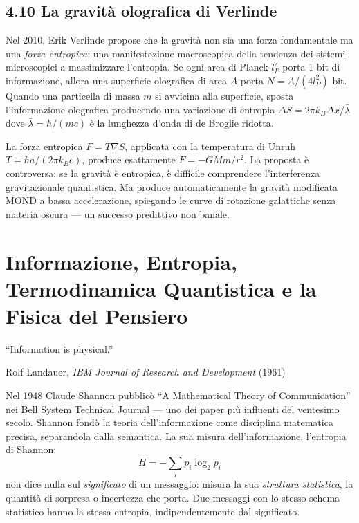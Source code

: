 \documentclass[11.5pt,a4paper,openany]{book}
\theoremstyle{remark}
\begin{document}
\section{4.10 La gravità olografica di Verlinde}

Nel 2010, Erik Verlinde propose che la gravità non sia una forza fondamentale ma una \textit{forza entropica}: una manifestazione macroscopica della tendenza dei sistemi microscopici a massimizzare l'entropia. Se ogni area di Planck $l_P^2$ porta 1 bit di informazione, allora una superficie olografica di area $A$ porta $N = A/(4l_P^2)$ bit. Quando una particella di massa $m$ si avvicina alla superficie, sposta l'informazione olografica producendo una variazione di entropia $\Delta S = 2\pi k_B \Delta x/\bar\lambda$ dove $\bar\lambda = \hbar/(mc)$ è la lunghezza d'onda di de Broglie ridotta.

La forza entropica $F = T\nabla S$, applicata con la temperatura di Unruh $T = \hbar a/(2\pi k_B c)$, produce esattamente $F = -GMm/r^2$. La proposta è controversa: se la gravità è entropica, è difficile comprendere l'interferenza gravitazionale quantistica. Ma produce automaticamente la gravità modificata MOND a bassa accelerazione, spiegando le curve di rotazione galattiche senza materia oscura --- un successo predittivo non banale.

\chapter{Informazione, Entropia, Termodinamica Quantistica e la Fisica del Pensiero}

\epigraph{``Information is physical.''}{Rolf Landauer, \textit{IBM Journal of Research and Development} (1961)}

Nel 1948 Claude Shannon pubblicò ``A Mathematical Theory of Communication'' nei Bell System Technical Journal --- uno dei paper più influenti del ventesimo secolo. Shannon fondò la teoria dell'informazione come disciplina matematica precisa, separandola dalla semantica. La sua misura dell'informazione, l'entropia di Shannon:
\[
H = -\sum_i p_i \log_2 p_i
\]
non dice nulla sul \textit{significato} di un messaggio: misura la sua \textit{struttura statistica}, la quantità di sorpresa o incertezza che porta. Due messaggi con lo stesso schema statistico hanno la stessa entropia, indipendentemente dal significato.
\end{document}
